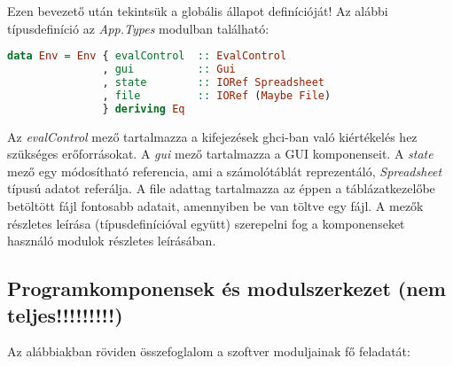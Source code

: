 Ezen bevezető után tekintsük a globális állapot definícióját! Az alábbi típusdefiníció az \textit{App.Types} modulban található:
\begin{lstlisting}[language={Haskell}]
data Env = Env { evalControl  :: EvalControl
               , gui          :: Gui
               , state        :: IORef Spreadsheet
               , file         :: IORef (Maybe File)
               } deriving Eq
\end{lstlisting}

Az \textit{evalControl} mező tartalmazza a kifejezések ghci-ban való kiértékelés hez szükséges erőforrásokat. A \textit{gui} mező tartalmazza a GUI komponenseit. A \textit{state} mező egy módosítható referencia, ami a számolótáblát reprezentáló, \textit{Spreadsheet} típusú adatot referálja. A file adattag tartalmazza az éppen a táblázatkezelőbe betöltött fájl fontosabb adatait, amennyiben be van töltve egy fájl. A mezők részletes leírása (típusdefinícióval együtt) szerepelni fog a komponenseket használó modulok részletes leírásában.

\subsection{Programkomponensek és modulszerkezet (nem teljes!!!!!!!!!)}

Az alábbiakban röviden összefoglalom a szoftver moduljainak fő feladatát:

